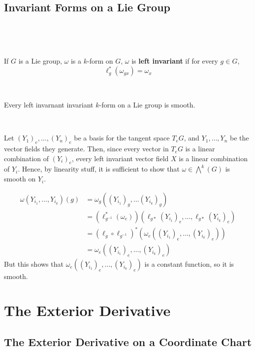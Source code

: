 \documentclass{article}
\begin{document}
\subsection{Invariant Forms on a Lie Group}
\

\begin{definition}
  \

  If $G$ is a Lie group, $\omega$ is a $k$-form on $G$, $\omega$ is \textbf{left invariant} if for every $g \in G$, $$\ell_g^*(\omega_{gx}) = \omega_x$$
\end{definition}

\begin{proposition}
  \

  Every left invarnant invariant $k$-form on a Lie group is smooth.
\end{proposition}

\begin{customproof}
  \

  Let $(Y_1)_e, \dots, (Y_n)_e$ be a basis for the tangent space $T_eG$, and $Y_1, \dots, Y_n$ be the vector fields they generate. Then, since every vector in $T_eG$ is a linear combination of $(Y_i)_e$, every left invariant vector field $X$ is a linear combination of $Y_i$. Hence, by linearity stuff, it is sufficient to show that $\omega \in \bigwedge^k(G)$ is smooth on $Y_i$.

  \begin{align*}
    \omega(Y_{i_1}, \dots, Y_{i_k})(g) &= \omega_g((Y_{i_1})_g, \dots (Y_{i_k})_g)\\
    &= (\ell^*_{g ^{-1}}(\omega_e))(\ell_{g*}(Y_{i_1})_e, \dots, \ell_{g*}(Y_{i_k})_e)\\
    &= (\ell_g \circ \ell_{g ^{-1}} )^*(\omega_e((Y_{i_1})_e, \dots, (Y_{i_k})_e))\\
    &= \omega_e((Y_{i_1})_e, \dots, (Y_{i_k})_e)
  \end{align*}But this shows that $\omega_e((Y_{i_1})_e, \dots, (Y_{i_k})_e)$ is a constant function, so it is smooth.

\end{customproof}

\section{The Exterior Derivative}

\subsection{The Exterior Derivative on a Coordinate Chart}
\
\end{document}
